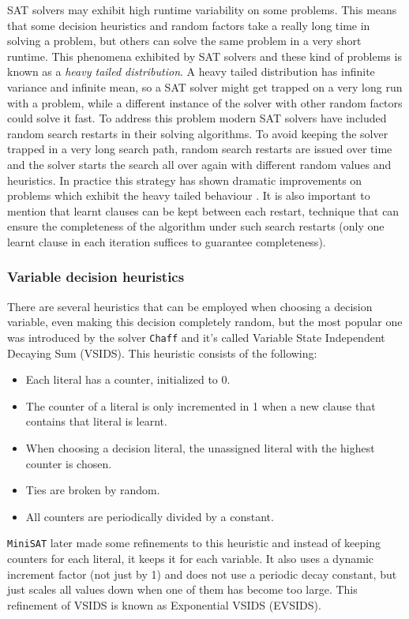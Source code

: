 \documentclass[12pt]{diicc}
\begin{document}
SAT solvers may exhibit high runtime variability on some problems. This means that some decision heuristics and random factors take a really long time in solving a problem, but others can solve the same problem in a very short runtime. This phenomena exhibited by SAT solvers and these kind of problems is known as a \textit{heavy tailed distribution}. A heavy tailed distribution has infinite variance and infinite mean, so a SAT solver might get trapped on a very long run with a problem, while a different instance of the solver with other random factors could solve it fast. To address this problem modern SAT solvers have included random search restarts in their solving algorithms. To avoid keeping the solver trapped in a very long search path, random search restarts are issued over time and the solver starts the search all over again with different random values and heuristics. In practice this strategy has shown dramatic improvements on problems which exhibit the heavy tailed behaviour \cite{heavytail}. It is also important to mention that learnt clauses can be kept between each restart, technique that can ensure the completeness of the algorithm under such search restarts (only one learnt clause in each iteration suffices to guarantee completeness\cite{NEEDED}). 

\subsubsection{Variable decision heuristics}

There are several heuristics that can be employed when choosing a decision variable, even making this decision completely random, but the most popular one was introduced by the solver \texttt{Chaff} and it's called Variable State Independent Decaying Sum (VSIDS). This heuristic consists of the following:
\begin{itemize}
	\item Each literal has a counter, initialized to 0.
	\item The counter of a literal is only incremented in 1 when a new clause that contains that literal is learnt.
	\item When choosing a decision literal, the unassigned literal with the highest counter is chosen.
	\item Ties are broken by random.
	\item All counters are periodically divided by a constant.
\end{itemize}
\texttt{MiniSAT} \cite{minisat} later made some refinements to this heuristic and instead of keeping counters for each literal, it keeps it for each variable. It also uses a dynamic increment factor (not just by 1) and does not use a periodic decay constant, but just scales all values down when one of them has become too large. This refinement of VSIDS is known as Exponential VSIDS (EVSIDS). 
\end{document}
